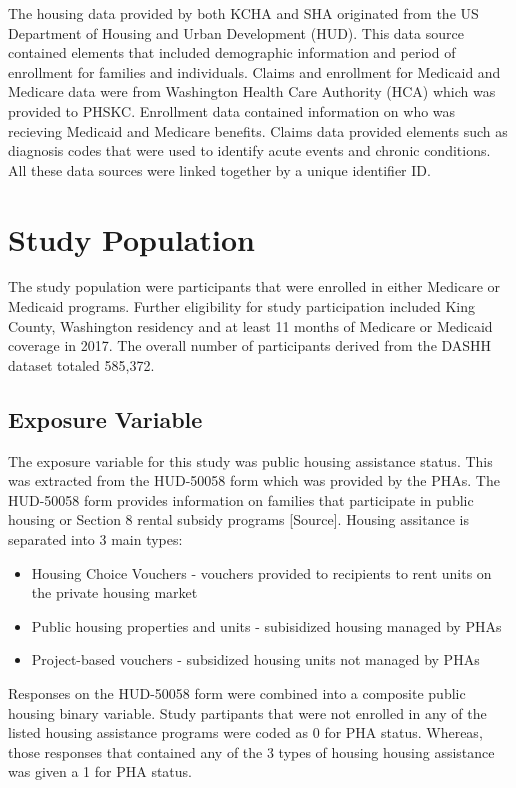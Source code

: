 \documentclass [11pt, proquest] {uwthesis}[2015/03/03]
\providecommand{\tightlist}{%
  \setlength{\itemsep}{0pt}\setlength{\parskip}{0pt}}
\begin{document}
The housing data provided by both KCHA and SHA originated from the US
Department of Housing and Urban Development (HUD). This data source
contained elements that included demographic information and period of
enrollment for families and individuals. Claims and enrollment for
Medicaid and Medicare data were from Washington Health Care Authority
(HCA) which was provided to PHSKC. Enrollment data contained information
on who was recieving Medicaid and Medicare benefits. Claims data
provided elements such as diagnosis codes that were used to identify
acute events and chronic conditions. All these data sources were linked
together by a unique identifier ID.

\section{Study Population}\label{study-population}

The study population were participants that were enrolled in either
Medicare or Medicaid programs. Further eligibility for study
participation included King County, Washington residency and at least 11
months of Medicare or Medicaid coverage in 2017. The overall number of
participants derived from the DASHH dataset totaled 585,372.

\subsection{Exposure Variable}\label{exposure-variable}

The exposure variable for this study was public housing assistance
status. This was extracted from the HUD-50058 form which was provided by
the PHAs. The HUD-50058 form provides information on families that
participate in public housing or Section 8 rental subsidy programs
{[}Source{]}. Housing assitance is separated into 3 main types:
\begin{itemize}
\tightlist
\item
  Housing Choice Vouchers - vouchers provided to recipients to rent
  units on the private housing market
\item
  Public housing properties and units - subisidized housing managed by
  PHAs
\item
  Project-based vouchers - subsidized housing units not managed by PHAs
\end{itemize}
Responses on the HUD-50058 form were combined into a composite public
housing binary variable. Study partipants that were not enrolled in any
of the listed housing assistance programs were coded as 0 for PHA
status. Whereas, those responses that contained any of the 3 types of
housing housing assistance was given a 1 for PHA status.
\end{document}
